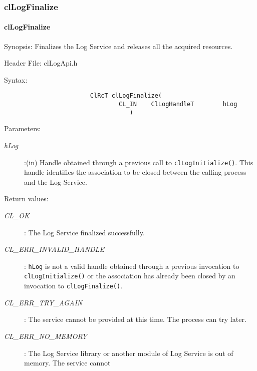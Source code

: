 \begin{flushleft}
\subsubsection{clLogFinalize}
\hypertarget{pagelog102}{}\paragraph{cl\-Log\-Finalize}\label{pagelog102}
\begin{Desc}
\item[Synopsis:]Finalizes the Log Service and releases all the acquired resources.\end{Desc}
\begin{Desc}
\item[Header File:] clLogApi.h \end{Desc}
\begin{Desc}
\item[Syntax:]
\footnotesize\begin{verbatim}        	
						ClRcT clLogFinalize(
           						CL_IN    ClLogHandleT        hLog
								   )
\end{verbatim}
\normalsize
\end{Desc}
\begin{Desc}
\item[Parameters:] \begin{description}
\item[{\em hLog}]:(in) Handle obtained through a previous call to {\tt{clLogInitialize()}}. This handle identifies the association to be closed 
between the calling process and the Log Service.
\end{description}
\end{Desc}
\begin{Desc}
\item[Return values:]
\begin{description}
\item[{\em CL\_\-OK}]: The Log Service finalized successfully.
\item[{\em CL\_\-ERR\_\-INVALID\_\-HANDLE}]: {\tt{hLog}} is not a valid handle obtained through a previous invocation to 
{\tt{clLogInitialize()}} or the association has already been closed by an invocation to {\tt{clLogFinalize()}}.
\item[{\em CL\_\-ERR\_\-TRY\_\-AGAIN}]: The service cannot be provided at this time. The process can try later.
\item[{\em CL\_\-ERR\_\-NO\_\-MEMORY}]: The Log Service library or another module of Log Service is out of memory. The service cannot 

\end{description}
\end{Desc}
\end{flushleft}
